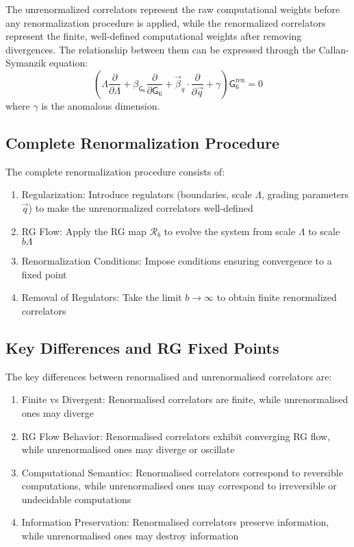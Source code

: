 The unrenormalized correlators represent the raw computational weights before any renormalization procedure is applied, while the renormalized correlators represent the finite, well-defined computational weights after removing divergences. The relationship between them can be expressed through the Callan-Symanzik equation:
\[
\left(\Lambda \frac{\partial}{\partial \Lambda} + \beta_{\mathsf{G}_6} \frac{\partial}{\partial \mathsf{G}_6} + \vec{\beta}_q \cdot \frac{\partial}{\partial \vec{q}} + \gamma\right) \mathsf{G}_6^{\text{ren}} = 0
\]
where $\gamma$ is the anomalous dimension.

\subsection{Complete Renormalization Procedure}

\begin{definition}
\label{def:complete-renormalization}
The complete renormalization procedure consists of:
\begin{enumerate}
\item Regularization: Introduce regulators (boundaries, scale $\Lambda$, grading parameters $\vec{q}$) to make the unrenormalized correlators well-defined
\item RG Flow: Apply the RG map $\mathcal{R}_b$ to evolve the system from scale $\Lambda$ to scale $b\Lambda$
\item Renormalization Conditions: Impose conditions ensuring convergence to a fixed point
\item Removal of Regulators: Take the limit $b \to \infty$ to obtain finite renormalized correlators
\end{enumerate}
\end{definition}

\subsection{Key Differences and RG Fixed Points}

\begin{theorem}
\label{thm:renormalised-difference}
The key differences between renormalised and unrenormalised correlators are:
\begin{enumerate}
\item Finite vs Divergent: Renormalised correlators are finite, while unrenormalised ones may diverge
\item RG Flow Behavior: Renormalised correlators exhibit converging RG flow, while unrenormalised ones may diverge or oscillate
\item Computational Semantics: Renormalised correlators correspond to reversible computations, while unrenormalised ones may correspond to irreversible or undecidable computations
\item Information Preservation: Renormalised correlators preserve information, while unrenormalised ones may destroy information
\end{enumerate}
\end{theorem}

